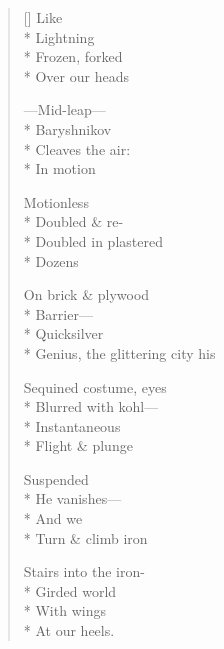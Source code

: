 \label{ch:appearance}
\settowidth{\versewidth}{            Genius, the glittering city his}
\begin{verse}[\versewidth]
\hspace*{4\vgap} Like\\*
\hspace*{3\vgap} Lightning\\*
Frozen, forked\\*
\hspace*{4\vgap} Over our heads

---Mid-leap---\\*
\hspace*{3\vgap} Baryshnikov\\*
\hspace*{4\vgap} Cleaves the air:\\*
\hspace*{1\vgap} In motion

Motionless\\*
Doubled \& re-\\*
Doubled in plastered\\*
Dozens

On brick \& plywood\\*
Barrier---\\*
\hspace*{4\vgap} Quicksilver\\*
\hspace*{3\vgap} Genius, the glittering city his

Sequined costume, eyes\\*
\hspace*{2\vgap} Blurred with kohl---\\*
\hspace*{3\vgap} Instantaneous\\*
Flight \& plunge

\hspace*{3\vgap} Suspended\\*
He vanishes---\\*
\hspace*{4\vgap} And we\\*
Turn \& climb iron

Stairs into the iron-\\*
Girded world\\*
With wings\\*
At our heels.
\end{verse}
